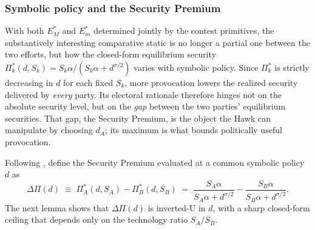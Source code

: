 \documentclass[11pt,twoside]{extarticle}
\begin{document}

\subsubsection{Symbolic policy and the Security Premium}
With both $E_M^*$ and $E_m^*$ determined jointly by the contest primitives, the substantively interesting comparative static is no longer a partial one between the two efforts, but how the closed-form equilibrium security $\Pi_k^*(d,S_k)=S_k\alpha/(S_k\alpha+d^{\sigma/2})$ varies with symbolic policy. Since $\Pi_k^*$ is strictly decreasing in $d$ for each fixed $S_k$, more provocation lowers the realized security delivered by \emph{every} party. Its electoral rationale therefore hinges not on the absolute security level, but on the \emph{gap} between the two parties' equilibrium securities. That gap, the Security Premium, is the object the Hawk can manipulate by choosing $d_A$; its maximum is what bounds politically useful provocation.

Following \citet{barutSymmetricMultiplePrize1998}, define the Security Premium evaluated at a common symbolic policy $d$ as
\begin{equation} \label{eq:security_premium_d}
\Delta\Pi(d)\;\equiv\;\Pi_A^*(d,S_A)-\Pi_B^*(d,S_B)\;=\;\frac{S_A\alpha}{S_A\alpha+d^{\sigma/2}}-\frac{S_B\alpha}{S_B\alpha+d^{\sigma/2}}.
\end{equation}
The next lemma shows that $\Delta\Pi(d)$ is inverted-U in $d$, with a sharp closed-form ceiling that depends only on the technology ratio $S_A/S_B$.
\end{document}
